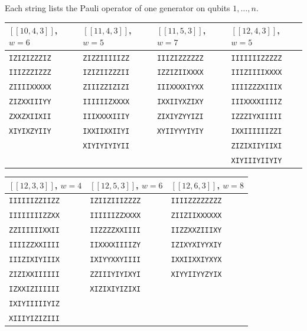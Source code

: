 \documentclass[a4paper,onecolumn,unpublished]{quantumarticle}
\theoremstyle{definition}
\theoremstyle{remark}
\newcommand{\qc}[1]{[\![#1]\!]}
\begin{document}
Each string lists the Pauli operator of one generator on qubits $1,\dots,n$.

\begin{center}
\small
\begin{tabular}{llll}
\toprule
$\qc{10,4,3}$, $w=6$ & $\qc{11,4,3}$, $w=5$ & $\qc{11,5,3}$, $w=7$ & $\qc{12,4,3}$, $w=5$ \\
\midrule
\texttt{IZIZIZZZIZ} & \texttt{ZIZZIIIIIZZ} & \texttt{IIIZIZZZZZZ} & \texttt{IIIIIIIZZZZZ} \\
\texttt{IIIZZZIZZZ} & \texttt{IZIZIIZZZII} & \texttt{IZZIZIIXXXX} & \texttt{IIIZIIIIXXXX} \\
\texttt{ZIIIIXXXXX} & \texttt{ZIIIZZIZIZI} & \texttt{IIIXXXXIYXX} & \texttt{IIIIZZZXIIIX} \\
\texttt{ZIZXXIIIYY} & \texttt{IIIIIIZXXXX} & \texttt{IXXIIYXZIXY} & \texttt{IIIXXXXIIIIZ} \\
\texttt{ZXXZXIIXII} & \texttt{IIIXXXXIIIY} & \texttt{ZIXIYZYYIZI} & \texttt{IZZZIYXIIIII} \\
\texttt{XIYIXZYIIY} & \texttt{IXXIIXXIIYI} & \texttt{XYIIYYYIYIY} & \texttt{IXXIIIIIIZZI} \\
                    & \texttt{XIYIYIYIYII} &                     & \texttt{ZIZIXIIYIIXI} \\
                    &                      &                     & \texttt{XIYIIIYIIYIY} \\
\bottomrule
\end{tabular}

\vspace{1em}
\begin{tabular}{lll}
\toprule
$\qc{12,3,3}$, $w=4$ & $\qc{12,5,3}$, $w=6$ & $\qc{12,6,3}$, $w=8$ \\
\midrule
\texttt{IIIIIIZZIIZZ} & \texttt{IZIIZIIIZZZZ} & \texttt{IIIIZZZZZZZZ} \\
\texttt{IIIIIIIIZZXX} & \texttt{IIIIIIZZXXXX} & \texttt{ZIIZIIXXXXXX} \\
\texttt{ZZIIIIIIXXII} & \texttt{IIZZZZXXIIII} & \texttt{IIZZXXZIIIXY} \\
\texttt{IIIIZZXXIIII} & \texttt{IIXXXXIIIIZY} & \texttt{IZIXYXIYYXIY} \\
\texttt{IIIZIXIYIIIX} & \texttt{IXIYYXXYIIII} & \texttt{IXXIIXXIYXYX} \\
\texttt{ZIZIXXIIIIII} & \texttt{ZZIIIYIYIXYI} & \texttt{XIYYIIYYZYIX} \\
\texttt{IZXXIZIIIIII} & \texttt{XIZIXIYIZIXI} & \\
\texttt{IXIYIIIIIYIZ} & & \\
\texttt{XIIIYIZIZIII} & & \\
\bottomrule
\end{tabular}
\end{center}



\end{document}
